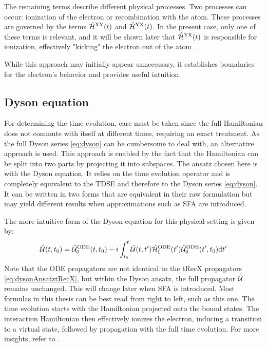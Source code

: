 The remaining terms describe different physical processes.
Two processes can occur: ionization of the electron or recombination with the atom.
These processes are governed by the terms $\hat{\mathcal{H}}^{\mathrm{XY}}(t)$ and $\hat{\mathcal{H}}^{\mathrm{YX}}(t)$.
In the present case, only one of these terms is relevant, and it will be shown later that $\hat{\mathcal{H}}^{\mathrm{YX}}(t)$ is responsible for ionization, effectively "kicking" the electron out of the atom \cite{Ivanov20012005}.

While this approach may initially appear unnecessary, it establishes boundaries for the electron's behavior and provides useful intuition.










\subsection{Dyson equation}
For determining the time evolution, care must be taken since the full Hamiltonian does not commute with itself at different times, requiring an exact treatment.
As the full Dyson series \eqref{eq:dyson} can be cumbersome to deal with, an alternative approach is used.
This approach is enabled by the fact that the Hamiltonian can be split into two parts by projecting it into subspaces.
The ansatz chosen here is with the Dyson equation.
It relies on the time evolution operator and is completely equivalent to the TDSE and therefore to the Dyson series \eqref{eq:dyson}.
It can be written in two forms that are equivalent in their raw formulation but may yield different results when approximations such as SFA are introduced.\

The more intuitive form of the Dyson equation for this physical setting is given by:
\begin{equation}
    \hat{\mathcal{U}}(t,t_0)=\hat{\mathcal{U}}^{\mathrm{ODE}}_0(t,t_0)-i\int_{t_0}^{t} \hat{\mathcal{U}}(t,t')\hat{\mathcal{H}}^{\mathrm{ODE}}_{\mathrm{I}}(t')\hat{\mathcal{U}}^{\mathrm{ODE}}_0(t',t_0) \mathrm{d} t'       \label{eq:dysonAnsatzODE}
\end{equation}
Note that the ODE propagators are not identical to the tRecX propagators \eqref{eq:dysonAnsatztRecX}, but within the Dyson ansatz, the full propagator $\hat{\mathcal{U}}$ remains unchanged.
This will change later when SFA is introduced.
Most formulas in this thesis can be best read from right to left, such as this one.
The time evolution starts with the Hamiltonian projected onto the bound states.
The interaction Hamiltonian then effectively ionizes the electron, inducing a transition to a virtual state, followed by propagation with the full time evolution. 
For more insights, refer to \cite{Ivanov20012005}.

